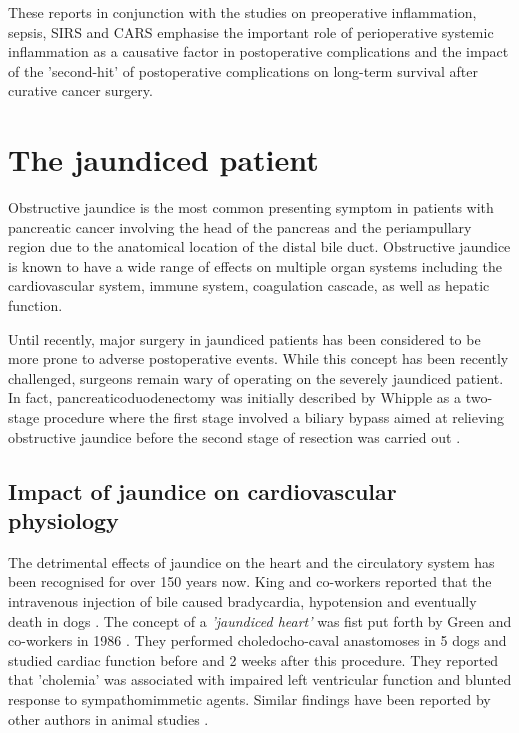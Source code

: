 These reports in conjunction with the studies on preoperative inflammation, sepsis, SIRS and CARS emphasise the important role of perioperative systemic inflammation as a causative factor in postoperative complications and the impact of the 'second-hit' of postoperative complications on long-term survival after curative cancer surgery.


\section{The jaundiced patient}

Obstructive jaundice is the most common presenting symptom in patients with pancreatic cancer involving the head of the pancreas and the periampullary region due to the anatomical location of the distal bile duct. 
Obstructive jaundice is known to have a wide range of effects on multiple organ systems including the cardiovascular system, immune system, coagulation cascade, as well as hepatic function.

Until recently, major surgery in jaundiced patients has been considered to be more prone to adverse postoperative events. 
While this concept has been recently challenged, surgeons remain wary of operating on the severely jaundiced patient. 
In fact, pancreaticoduodenectomy was initially described by Whipple as a two-stage procedure where the first stage involved a biliary bypass aimed at relieving obstructive jaundice before the second stage of resection was carried out \parencite{whipple_treatment_1935}.


\subsection{Impact of jaundice on cardiovascular physiology}

The detrimental effects of jaundice on the heart and the circulatory system has been recognised for over 150 years now. 
King and co-workers reported that the intravenous injection of bile caused bradycardia, hypotension and eventually death in dogs \parencite{king_effect_1909}. 
The concept of a \textit{'jaundiced heart'} was fist put forth by Green and co-workers in 1986 \parencite{green_jaundiced_1986}. 
They performed choledocho-caval anastomoses in 5 dogs and studied cardiac function before and 2 weeks after this procedure. 
They reported that 'cholemia' was associated with impaired left ventricular function and blunted response to sympathomimmetic agents. 
Similar findings have been reported by other authors in animal studies \parencite{binah_obstructive_1985,bomzon_systemic_1986}. 

